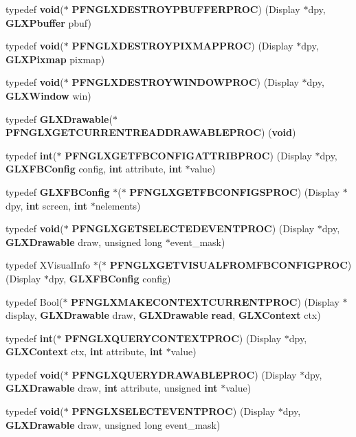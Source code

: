 \begin{DoxyCompactItemize}
\item 
typedef {\bf void}($\ast$ {\bf P\+F\+N\+G\+L\+X\+D\+E\+S\+T\+R\+O\+Y\+P\+B\+U\+F\+F\+E\+R\+P\+R\+OC}) (Display $\ast$dpy, {\bf G\+L\+X\+Pbuffer} pbuf)
\item 
typedef {\bf void}($\ast$ {\bf P\+F\+N\+G\+L\+X\+D\+E\+S\+T\+R\+O\+Y\+P\+I\+X\+M\+A\+P\+P\+R\+OC}) (Display $\ast$dpy, {\bf G\+L\+X\+Pixmap} pixmap)
\item 
typedef {\bf void}($\ast$ {\bf P\+F\+N\+G\+L\+X\+D\+E\+S\+T\+R\+O\+Y\+W\+I\+N\+D\+O\+W\+P\+R\+OC}) (Display $\ast$dpy, {\bf G\+L\+X\+Window} win)
\item 
typedef {\bf G\+L\+X\+Drawable}($\ast$ {\bf P\+F\+N\+G\+L\+X\+G\+E\+T\+C\+U\+R\+R\+E\+N\+T\+R\+E\+A\+D\+D\+R\+A\+W\+A\+B\+L\+E\+P\+R\+OC}) ({\bf void})
\item 
typedef {\bf int}($\ast$ {\bf P\+F\+N\+G\+L\+X\+G\+E\+T\+F\+B\+C\+O\+N\+F\+I\+G\+A\+T\+T\+R\+I\+B\+P\+R\+OC}) (Display $\ast$dpy, {\bf G\+L\+X\+F\+B\+Config} config, {\bf int} attribute, {\bf int} $\ast$value)
\item 
typedef {\bf G\+L\+X\+F\+B\+Config} $\ast$($\ast$ {\bf P\+F\+N\+G\+L\+X\+G\+E\+T\+F\+B\+C\+O\+N\+F\+I\+G\+S\+P\+R\+OC}) (Display $\ast$dpy, {\bf int} screen, {\bf int} $\ast$nelements)
\item 
typedef {\bf void}($\ast$ {\bf P\+F\+N\+G\+L\+X\+G\+E\+T\+S\+E\+L\+E\+C\+T\+E\+D\+E\+V\+E\+N\+T\+P\+R\+OC}) (Display $\ast$dpy, {\bf G\+L\+X\+Drawable} draw, unsigned long $\ast$event\+\_\+mask)
\item 
typedef X\+Visual\+Info $\ast$($\ast$ {\bf P\+F\+N\+G\+L\+X\+G\+E\+T\+V\+I\+S\+U\+A\+L\+F\+R\+O\+M\+F\+B\+C\+O\+N\+F\+I\+G\+P\+R\+OC}) (Display $\ast$dpy, {\bf G\+L\+X\+F\+B\+Config} config)
\item 
typedef Bool($\ast$ {\bf P\+F\+N\+G\+L\+X\+M\+A\+K\+E\+C\+O\+N\+T\+E\+X\+T\+C\+U\+R\+R\+E\+N\+T\+P\+R\+OC}) (Display $\ast$display, {\bf G\+L\+X\+Drawable} draw, {\bf G\+L\+X\+Drawable} {\bf read}, {\bf G\+L\+X\+Context} ctx)
\item 
typedef {\bf int}($\ast$ {\bf P\+F\+N\+G\+L\+X\+Q\+U\+E\+R\+Y\+C\+O\+N\+T\+E\+X\+T\+P\+R\+OC}) (Display $\ast$dpy, {\bf G\+L\+X\+Context} ctx, {\bf int} attribute, {\bf int} $\ast$value)
\item 
typedef {\bf void}($\ast$ {\bf P\+F\+N\+G\+L\+X\+Q\+U\+E\+R\+Y\+D\+R\+A\+W\+A\+B\+L\+E\+P\+R\+OC}) (Display $\ast$dpy, {\bf G\+L\+X\+Drawable} draw, {\bf int} attribute, unsigned {\bf int} $\ast$value)
\item 
typedef {\bf void}($\ast$ {\bf P\+F\+N\+G\+L\+X\+S\+E\+L\+E\+C\+T\+E\+V\+E\+N\+T\+P\+R\+OC}) (Display $\ast$dpy, {\bf G\+L\+X\+Drawable} draw, unsigned long event\+\_\+mask)

\end{DoxyCompactItemize}

